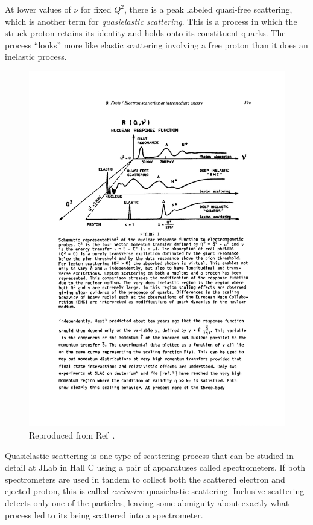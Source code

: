 At lower values of $\nu$ for fixed $Q^2$, there is a peak labeled
quasi-free scattering, which is another term for \textit{quasielastic
scattering}.
This is a process in which the struck proton retains its identity and holds
onto its constituent quarks.
The process ``looks'' more like elastic scattering involving a free proton than
it does an inelastic process.

\begin{figure}[!h]
    \centering
    \includegraphics[width=1.0\textwidth]{chap1/nuclear_response_function.pdf}
    \caption{
             Reproduced from Ref~\cite{Frois_1985}.
            }
    \label{fig:nuclear_response_function}
\end{figure}

Quasielastic scattering is one type of scattering process that can be studied
in detail at JLab in Hall C using a pair of apparatuses called spectrometers.
If both spectrometers are used in tandem to collect both the scattered electron
and ejected proton, this is called \textit{exclusive} quasielastic scattering.
Inclusive scattering detects only one of the particles, leaving some abmiguity
about exactly what process led to its being scattered into a spectrometer.


